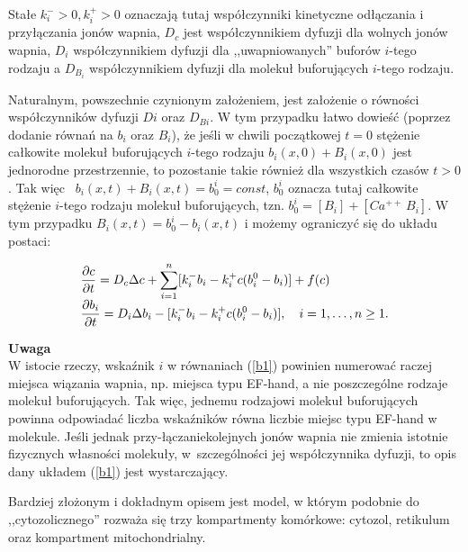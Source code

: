 \noindent Stałe $k^{-}_i>0, k^{+}_i>0$ oznaczają tutaj współczynniki kinetyczne 
odłączania i przyłączania jonów wapnia, $D_c$ jest współczynnikiem dyfuzji dla wolnych jonów wapnia, $D_i$ współczynnikiem dyfuzji dla ,,uwapniowanych'' buforów $i$-tego rodzaju a 
$D_{B_i}$ współczynnikiem dyfuzji dla molekuł buforujących $i$-tego rodzaju. 

\medskip 

Naturalnym, powszechnie czynionym założeniem, jest założenie o równości współczynników dyfuzji 
$D{i}$ oraz $D_{Bi}$. W tym przypadku łatwo dowieść (poprzez dodanie 
równań na $b_i$ oraz $B_i$), że jeśli w chwili początkowej $t=0$ 
stężenie całkowite molekuł buforujących $i$-tego rodzaju $b_i(x,0) + B_i(x,0)$ jest jednorodne przestrzennie, 
to pozostanie takie również dla wszystkich czasów $t>0$. Tak więc ~$b_i(x,t) + B_i(x,t)=b^i_0= const$, 
$b^i_0$ oznacza tutaj całkowite stężenie $i$-tego rodzaju molekuł buforujących, tzn. $b^i_0 =[B_i] + [Ca^{++}\,B_i]$. 
W tym przypadku $B_i(x,t)=b^i_0 - b_i(x,t)$ i możemy ograniczyć się do układu postaci: 



\begin{equation} \label{b1}
\begin{array}{l}
	{\displaystyle
		\frac{\partial c}{\partial t} = D_c \Delta c +
		\sum_{i=1}^n [ k^{-}_i b_i - k^{+}_i c (b_i^0 -b_i)] + f(c)
	}\\[2ex]
	{\displaystyle
		\frac{\partial{b}_i}{\partial t} = D_i \Delta b_i
		- [k^{-}_i b_i - k^{+}_i c (b_i^0 -b_i)], \quad i=1,\ldots,n \geq 1. 
	}
\end{array}
\end{equation}

\medskip 

\noindent \textbf{Uwaga}\\\noindent W istocie rzeczy, wskaźnik $i$ w równaniach (\ref{b1}) powinien numerować raczej miejsca wiązania wapnia, np. miejsca typu EF-hand, a nie poszczególne rodzaje molekuł buforujących. Tak więc, jednemu rodzajowi molekuł buforujących powinna odpowiadać liczba wskaźników równa liczbie miejsc typu EF-hand w molekule. Jeśli jednak przy-łączaniekolejnych jonów wapnia nie zmienia istotnie fizycznych własności molekuły, w~szczególności jej współczynnika dyfuzji, to opis dany układem (\ref{b1}) jest wystarczający. \B 

\bigskip 

Bardziej złożonym i dokładnym opisem jest model, w którym podobnie do ,,cytozolicznego'' rozważa się trzy kompartmenty komórkowe: cytozol, retikulum oraz kompartment mitochondrialny. 

